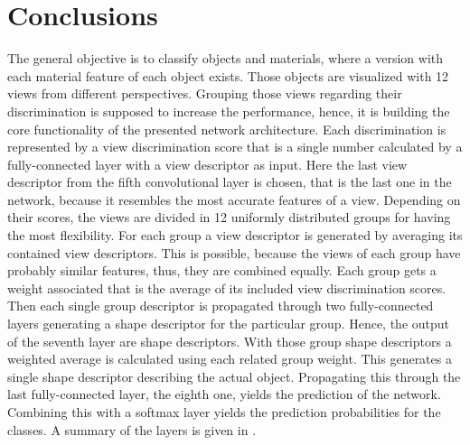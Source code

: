 \section{Conclusions}
\label{sec:discussion-conclusion}
The general objective is to classify objects and materials, where a version with each material feature of each object exists.
Those objects are visualized with 12 views from different perspectives.
Grouping those views regarding their discrimination is supposed to increase the performance, hence, it is building the core functionality of the presented network architecture.
Each discrimination is represented by a view discrimination score that is a single number calculated by a fully-connected layer with a view descriptor as input.
Here the last view descriptor from the fifth convolutional layer is chosen, that is the last one in the network, because it resembles the most accurate features of a view.
Depending on their scores, the views are divided in 12 uniformly distributed groups for having the most flexibility.
For each group a view descriptor is generated by averaging its contained view descriptors.
This is possible, because the views of each group have probably similar features, thus, they are combined equally.
Each group gets a weight associated that is the average of its included view discrimination scores.
Then each single group descriptor is propagated through two fully-connected layers generating a shape descriptor for the particular group.
Hence, the output of the seventh layer are shape descriptors.
With those group shape descriptors a weighted average is calculated using each related group weight.
This generates a single shape descriptor describing the actual object.
Propagating this through the last fully-connected layer, the eighth one, yields the prediction of the network.
Combining this with a softmax layer yields the prediction probabilities for the classes.
A summary of the layers is given in .
